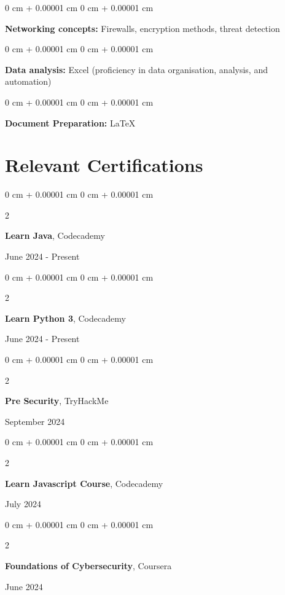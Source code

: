 \documentclass[10pt, letterpaper]{article}
\newenvironment{onecolentry}{
    \begin{adjustwidth}{
        0 cm + 0.00001 cm
    }{
        0 cm + 0.00001 cm
    }
}{
    \end{adjustwidth}
} %
\newenvironment{twocolentry}[2][]{
    \onecolentry
    \def\secondColumn{#2}
    \setcolumnwidth{\fill, 4.5 cm}
    \begin{paracol}{2}
}{
    \switchcolumn \raggedleft \secondColumn
    \end{paracol}
    \endonecolentry
} %
\begin{document}
        \begin{onecolentry}
            \textbf{Networking concepts:} Firewalls, encryption methods, threat detection
        \end{onecolentry}
         \vspace{0.05 cm}

        \begin{onecolentry}
            \textbf{Data analysis:} Excel (proficiency in data organisation, analysis, and automation)
        \end{onecolentry}


    \vspace{0.05 cm}

        \begin{onecolentry}
            \textbf{Document Preparation:} LaTeX
        \end{onecolentry}






\section{Relevant Certifications}

    \begin{twocolentry}{
    June 2024 - Present
}
    \textbf{Learn Java}, Codecademy   
\end{twocolentry}

 \vspace{0.05 cm}
     \begin{twocolentry}{
    June 2024 - Present
}
    \textbf{Learn Python 3}, Codecademy   
\end{twocolentry}

 \vspace{0.05 cm}
      \begin{twocolentry}{
    September 2024
}
    \textbf{Pre Security}, TryHackMe
\end{twocolentry}

 \vspace{0.05 cm}

       \begin{twocolentry}{
    July 2024
}
    \textbf{Learn Javascript Course}, Codecademy
\end{twocolentry}

 \vspace{0.05 cm}
       \begin{twocolentry}{
   June 2024
}
    \textbf{Foundations of Cybersecurity}, Coursera
    
\end{twocolentry}
\end{document}
